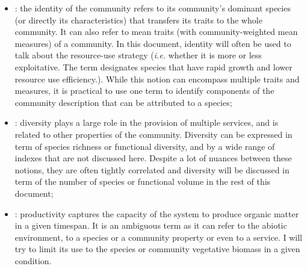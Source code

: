 \begin{itemize}
\item {}: the identity of the community refers to its community's dominant species (or directly its characteristics) that transfers its traits to the whole community. It can also refer to mean traits (with community-weighted mean measures) of a community. In this document, identity will often be used to talk about the resource-use strategy (\textit{i.e.} whether it is more or less exploitative. The term  designates species that have rapid growth and lower resource use efficiency.)\parencite{grime_evidence_1977}. While this notion can encompass multiple traits and measures, it is practical to use one term to identify components of the community description that can be attributed to a species;

\item {}: diversity plays a large role in the provision of multiple services, and is related to other properties of the community. Diversity can be expressed in term of species richness or functional diversity, and by a wide range of indexes that are not discussed here. Despite a lot of nuances between these notions, they are often tightly correlated and diversity will be discussed in term of the number of species or functional volume in the rest of this document;

\item {}: productivity captures the capacity of the system to produce organic matter in a given timespan. It is an ambiguous term as it can refer to the abiotic environment, to a species or a community property or even to a service. I will try to limit its use to the species or community vegetative biomass in a given condition.
\end{itemize}


